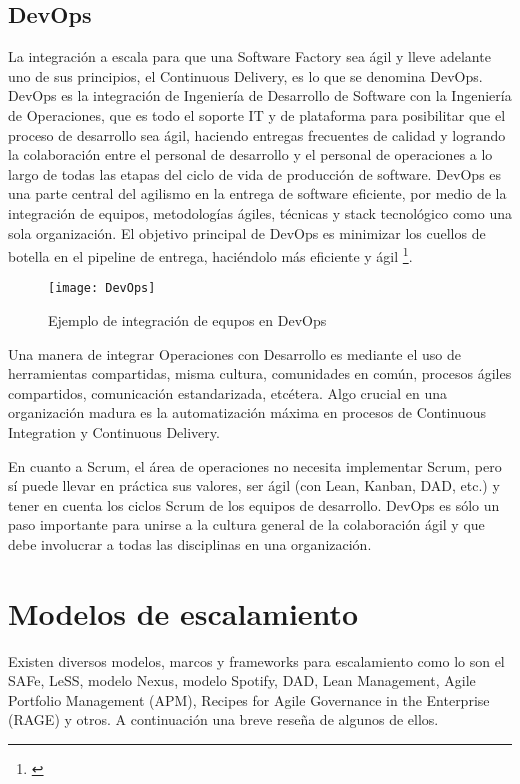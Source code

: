 \subsection{DevOps}

La integración a escala para que una Software Factory sea ágil y lleve adelante uno de sus principios, el Continuous Delivery, es lo que se denomina DevOps. DevOps es la integración de Ingeniería de Desarrollo de Software con la Ingeniería de Operaciones, que es todo el soporte IT y de plataforma para posibilitar que el proceso de desarrollo sea ágil, haciendo entregas frecuentes de calidad y logrando la colaboración entre el personal de desarrollo y el personal de operaciones a lo largo de todas las etapas del ciclo de vida de producción de software. DevOps es una parte central del agilismo en la entrega de software eficiente, por medio de la integración de equipos, metodologías ágiles, técnicas y stack tecnológico como una sola organización. El objetivo principal de DevOps es minimizar los cuellos de botella en el pipeline de entrega, haciéndolo más eficiente y ágil \footnote{\cite{DevOps-for-dummies-2015}}.

\begin{figure}[h]
  \centering
  \texttt{[image: DevOps]}
  \caption{Ejemplo de integración de equpos en DevOps}
  \centering
  \label{fig:DevOps} %
\end{figure}

Una manera de integrar Operaciones con Desarrollo es mediante el uso de herramientas compartidas, misma cultura, comunidades en común, procesos ágiles compartidos, comunicación estandarizada, etcétera. Algo crucial en una organización madura es la automatización máxima en procesos de Continuous Integration y Continuous Delivery.

En cuanto a Scrum, el área de operaciones no necesita implementar Scrum, pero sí puede llevar en práctica sus valores, ser ágil (con Lean, Kanban, DAD, etc.) y tener en cuenta los ciclos Scrum de los equipos de desarrollo. DevOps es sólo un paso importante para unirse a la cultura general de la colaboración ágil y que debe involucrar a todas las disciplinas en una organización. 


\section{Modelos de escalamiento}

Existen diversos modelos, marcos y frameworks para escalamiento como lo son el SAFe, LeSS, modelo Nexus, modelo Spotify, DAD, Lean Management, Agile Portfolio Management (APM), Recipes for Agile Governance in the Enterprise (RAGE) y otros. A continuación una breve reseña de algunos de ellos.

